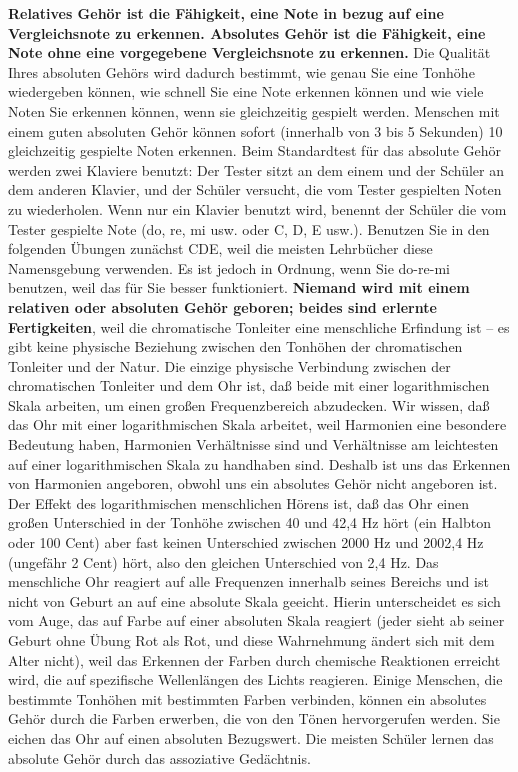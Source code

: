 \textbf{Relatives Gehör ist die Fähigkeit, eine Note in bezug auf eine Vergleichsnote zu erkennen.
Absolutes Gehör ist die Fähigkeit, eine Note ohne eine vorgegebene Vergleichsnote zu erkennen.}
Die Qualität Ihres absoluten Gehörs wird dadurch bestimmt, wie genau Sie eine Tonhöhe wiedergeben können, wie schnell Sie eine Note erkennen können und wie viele Noten Sie erkennen können, wenn sie gleichzeitig gespielt werden.
Menschen mit einem guten absoluten Gehör können sofort (innerhalb von 3 bis 5 Sekunden) 10 gleichzeitig gespielte Noten erkennen.
Beim Standardtest für das absolute Gehör werden zwei Klaviere benutzt: Der Tester sitzt an dem einem und der Schüler an dem anderen Klavier, und der Schüler versucht, die vom Tester gespielten Noten zu wiederholen.
Wenn nur ein Klavier benutzt wird, benennt der Schüler die vom Tester gespielte Note (do, re, mi usw. oder C, D, E usw.).
Benutzen Sie in den folgenden Übungen zunächst CDE, weil die meisten Lehrbücher diese Namensgebung verwenden.
Es ist jedoch in Ordnung, wenn Sie do-re-mi benutzen, weil das für Sie besser funktioniert.
\textbf{Niemand wird mit einem relativen oder absoluten Gehör geboren; beides sind erlernte Fertigkeiten}, weil die chromatische Tonleiter eine menschliche Erfindung ist -- es gibt keine physische Beziehung zwischen den Tonhöhen der chromatischen Tonleiter und der Natur.
Die einzige physische Verbindung zwischen der chromatischen Tonleiter und dem Ohr ist, daß beide mit einer logarithmischen Skala arbeiten, um einen großen Frequenzbereich abzudecken.
Wir wissen, daß das Ohr mit einer logarithmischen Skala arbeitet, weil Harmonien eine besondere Bedeutung haben, Harmonien Verhältnisse sind und Verhältnisse am leichtesten auf einer logarithmischen Skala zu handhaben sind.
Deshalb ist uns das Erkennen von Harmonien angeboren, obwohl uns ein absolutes Gehör nicht angeboren ist.
Der Effekt des logarithmischen menschlichen Hörens ist, daß das Ohr einen großen Unterschied in der Tonhöhe zwischen 40 und 42,4 Hz hört (ein Halbton oder 100 Cent) aber fast keinen Unterschied zwischen 2000 Hz und 2002,4 Hz (ungefähr 2 Cent) hört, also den gleichen Unterschied von 2,4 Hz.
Das menschliche Ohr reagiert auf alle Frequenzen innerhalb seines Bereichs und ist nicht von Geburt an auf eine absolute Skala geeicht.
Hierin unterscheidet es sich vom Auge, das auf Farbe auf einer absoluten Skala reagiert (jeder sieht ab seiner Geburt ohne Übung Rot als Rot, und diese Wahrnehmung ändert sich mit dem Alter nicht), weil das Erkennen der Farben durch chemische Reaktionen erreicht wird, die auf spezifische Wellenlängen des Lichts reagieren.
Einige Menschen, die bestimmte Tonhöhen mit bestimmten Farben verbinden, können ein absolutes Gehör durch die Farben erwerben, die von den Tönen hervorgerufen werden.
Sie eichen das Ohr auf einen absoluten Bezugswert.
Die meisten Schüler lernen das absolute Gehör durch das assoziative Gedächtnis.

